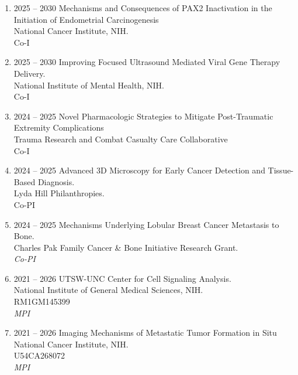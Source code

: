 \begin{enumerate}
[leftmargin=!,
labelindent=0pt,
itemindent=-66pt,
label=\textbullet]

\item 2025 -- 2030 
\hspace{8pt}
Mechanisms and Consequences of PAX2 Inactivation in the Initiation of Endometrial Carcinogenesis \\
National Cancer Institute, NIH. \\
Co-I \\ 

\item 2025 -- 2030 
\hspace{8pt}
Improving Focused Ultrasound Mediated Viral Gene Therapy Delivery. \\
National Institute of Mental Health, NIH. \\
Co-I \\ 

\item 2024 -- 2025 
\hspace{8pt}
Novel Pharmacologic Strategies to Mitigate Post-Traumatic Extremity Complications \\
Trauma Research and Combat Casualty Care Collaborative \\
Co-I \\ 

\item 2024 -- 2025 
\hspace{8pt}
Advanced 3D Microscopy for Early Cancer Detection and Tissue-Based Diagnosis. \\
Lyda Hill Philanthropies. \\
Co-PI \\ 

\item 2024 -- 2025 
\hspace{8pt}
Mechanisms Underlying Lobular Breast Cancer Metastasis to Bone. \\
Charles Pak Family Cancer \& Bone Initiative Research Grant. \\
{\it Co-PI}

\item 2021 -- 2026 
\hspace{8pt}
UTSW-UNC Center for Cell Signaling Analysis. \\
National Institute of General Medical Sciences, NIH. \\
RM1GM145399 \\ 
{\it MPI}

\item 2021 -- 2026 
\hspace{8pt}
Imaging Mechanisms of Metastatic Tumor Formation in Situ \\
National Cancer Institute, NIH. \\
U54CA268072 \\ 
{\it MPI}

\end{enumerate}

